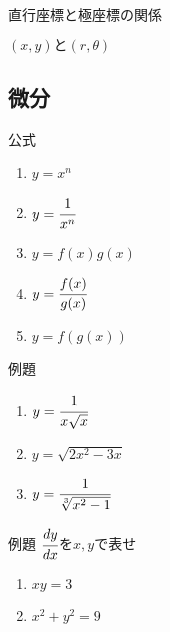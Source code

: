 \documentclass[10pt,dvipdfmx]{jsarticle}
\begin{document}
\begin{itembox}[l]{直行座標と極座標の関係}
  \begin{multicols}{2}
    \begin{minipage}{0.45\textwidth}
      $(x,y)と(r,\theta)$
    \end{minipage}
    \begin{minipage}{0.45\textwidth}
    \end{minipage}


  \end{multicols}
\end{itembox}


\newpage
\subsection*{微分}
公式
\begin{large}
  \begin{enumerate}
    \item $y=x^n$
    \item $y=\cfrac{1}{x^n}$
    \item $y=f(x)g(x)$
    \item $y=\cfrac{f(x)}{g(x)}$
    \item $y=f(g(x))$
  \end{enumerate}
\end{large}

\begin{itembox}[l]{例題}
  \begin{large}
    \begin{enumerate}
      \item $y=\cfrac{1}{x\sqrt{x}}$
      \item $y=\sqrt{2x^2-3x}$
      \item $y=\cfrac{1}{\sqrt[3]{x^2-1}}$
    \end{enumerate}
  \end{large}
\end{itembox}

\begin{itembox}[l]{例題}
  $\cfrac{dy}{dx}$を$x,y$で表せ
  \begin{large}
    \begin{enumerate}
      \item $xy=3$
      \item $x^2+y^2=9$
    \end{enumerate}
  \end{large}
\end{itembox}
\end{document}
